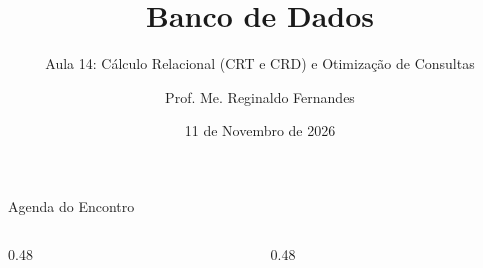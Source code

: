 \documentclass[aspectratio=169,utf8,t]{beamer}
\author{Prof. Me. Reginaldo Fernandes}
\institute{Instituto Federal do Ceará -- Campus Tauá \\ Tecnologia em Telemática}
\title{Banco de Dados}
\subtitle{Aula 14: Cálculo Relacional (CRT e CRD) e Otimização de Consultas}
\date{11 de Novembro de 2026}
\begin{document}

\frame[plain]{\titlepage}

\begin{frame}{Agenda do Encontro}
  \begin{columns}[t]
    \begin{column}{0.48\textwidth}
      \scriptsize
      \tableofcontents[sections={1-5}]
    \end{column}
    \begin{column}{0.48\textwidth}
      \scriptsize
      \tableofcontents[sections={6-9}]
    \end{column}
  \end{columns}
\end{frame}










\end{document}
